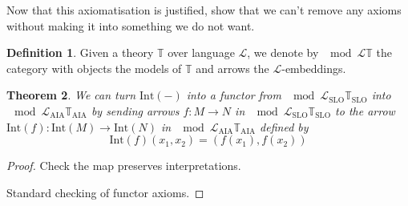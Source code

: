 \documentclass[11pt %
              ]{article}
\newcommand{\lang}{\mathcal{L}}
\newcommand{\theory}{\mathbb{T}}
\newcommand{\lslo}{\lang_\text{SLO}}
\newcommand{\tslo}{\theory_\text{SLO}}
\newcommand{\laia}{\lang_\text{AIA}}
\newcommand{\taia}{\theory_\text{AIA}}
\newcommand{\inter}[1][-]{\text{Int}\left(#1\right)}
\theoremstyle{plain}
\newtheorem{thm}{Theorem}%
\theoremstyle{definition}
\newtheorem{defn}[thm]{Definition}
\theoremstyle{remark}
\begin{document}
Now that this axiomatisation is justified, show that we can't remove any axioms without making
it into something we do not want.


\begin{defn}
  Given a theory $\theory$ over language $\lang$, we denote by $\mod{\lang}{\theory}$ the category
  with objects the models of $\theory$ and arrows the $\lang$-embeddings.
\end{defn}

\begin{thm}
  We can turn $\inter$ into a functor from $\mod{\lslo}{\tslo}$ into
  $\mod{\laia}{\taia}$ by sending arrows $f : M \to N$ in $\mod{\lslo}{\tslo}$ to the arrow
  $\inter[f] : \inter[M] \to \inter[N]$ in $\mod{\laia}{\taia}$ defined by
  \begin{equation*}
    \inter[f](x_1, x_2) = (f(x_1), f(x_2))
  \end{equation*}
\end{thm}
\begin{proof}
  Check the map preserves interpretations.

  Standard checking of functor axioms.
\end{proof}
\end{document}
